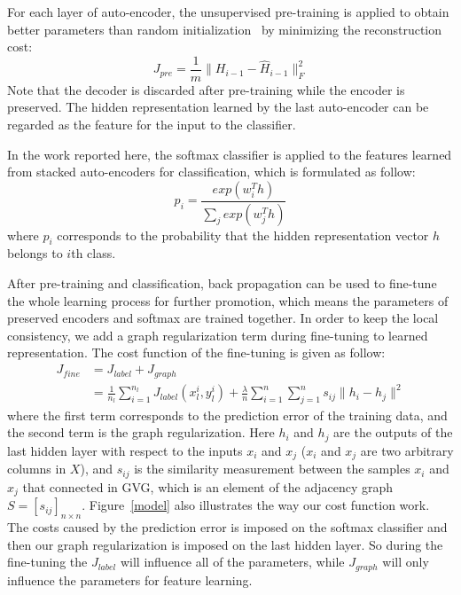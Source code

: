\documentclass[letterpaper, 10 pt, conference]{ieeeconf}  %
\begin{document}
For each layer of auto-encoder, the unsupervised pre-training is applied to obtain better parameters than random initialization~\cite{HinSal06} by minimizing the reconstruction cost:
\begin{equation}\label{jcostm}
    J_{pre} = \frac{1}{m}\|H_{i-1}-\hat{H}_{i-1}\|_F^2
\end{equation}
Note that the decoder is discarded after pre-training while the encoder is preserved. The hidden representation learned by the last auto-encoder can be regarded as the feature for the input to the classifier.

In the work reported here, the softmax classifier is applied to the features learned from stacked auto-encoders for classification, which is formulated as follow:
\begin{equation}\label{softmax}
p_i = \frac{exp(w_i^Th)}{\sum_{j}{exp(w_j^Th)}}
\end{equation} 
where $p_i$ corresponds to the probability that the hidden representation vector $h$ belongs to $i$th class.

After pre-training and classification, back propagation can be used to fine-tune the whole learning process for further promotion, which means the parameters of preserved encoders and softmax are trained together. In order to keep the local consistency, we add a graph regularization term during fine-tuning to learned representation. The cost function of the fine-tuning is given as follow:
\begin{equation}\label{jcost}
\begin{split}
    J_{fine} &= J_{label}+ J_{graph}\\
      &= \frac{1}{n_l}\sum_{i=1}^{n_l}{J_{label}(x_l^i,y_l^i)} + \frac{\lambda}{n}\sum_{i=1}^{n}\sum_{j=1}^{n}{s_{ij}\|h_i-h_j\|^2}
\end{split}
\end{equation}
where the first term corresponds to the prediction error of the training data, and the second term is the graph regularization. Here $h_i$ and $h_j$ are the outputs of the last hidden layer with respect to the inputs $x_i$ and $x_j$ ($x_i$ and $x_j$ are two arbitrary columns in $X$), and  $s_{ij}$ is the similarity measurement between the samples $x_i$ and $x_j$ that connected in GVG, which is an element of the adjacency graph $S=[s_{ij}]_{n\times n}$. Figure~\ref{model} also illustrates the way our cost function work. The costs caused by the prediction error is imposed on the softmax classifier and then our graph regularization is imposed on the last hidden layer. So during the fine-tuning the $J_{label}$ will influence all of the parameters, while $J_{graph}$ will only influence the parameters for feature learning.
\end{document}
